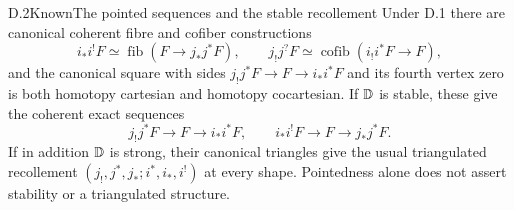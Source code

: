 \begin{statement}{D.2}{Known}{The pointed sequences and the stable recollement}
Under D.1 there are canonical coherent fibre and cofiber constructions
\[
 i_*i^!F\simeq\operatorname{fib}(F\to j_*j^*F),
 \qquad
 j_!j^?F\simeq\operatorname{cofib}(i_!i^*F\to F),
\]
and the canonical square with sides $j_!j^*F\to F\to i_*i^*F$ and its fourth vertex zero is both homotopy cartesian and homotopy cocartesian. If $\mathbb D$ is stable, these give the coherent exact sequences
\[
 j_!j^*F\longrightarrow F\longrightarrow i_*i^*F,
 \qquad
 i_*i^!F\longrightarrow F\longrightarrow j_*j^*F.
\]
If in addition $\mathbb D$ is strong, their canonical triangles give the usual triangulated recollement
$(j_!,j^*,j_*;i^*,i_*,i^!)$ at every shape. Pointedness alone does not assert stability or a triangulated structure.
\end{statement}
